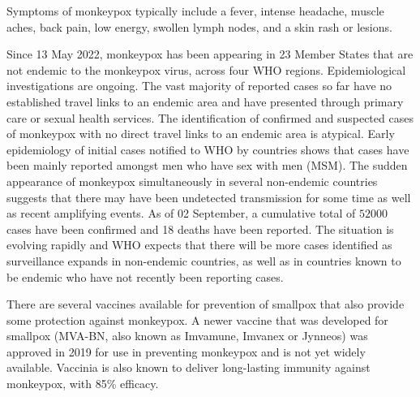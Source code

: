 Symptoms of monkeypox typically include a fever, intense headache, muscle aches, back pain, low energy, swollen lymph nodes, and a skin rash or lesions.

Since 13 May 2022, monkeypox has been appearing in 23 Member States that are not endemic to the monkeypox virus, across four WHO regions. Epidemiological investigations are ongoing. The vast majority of reported cases so far have no established travel links to an endemic area and have presented through primary care or sexual health services. The identification of confirmed and suspected cases of monkeypox with no direct travel links to an endemic area is atypical. Early epidemiology of initial cases notified to WHO by countries shows that cases have been mainly reported amongst men who have sex with men (MSM). The sudden appearance of monkeypox simultaneously in several non-endemic countries suggests that there may have been undetected transmission for some time as well as recent amplifying events.
As of 02 September, a cumulative total of $52000$ cases have been confirmed and 18 deaths have been reported.
The situation is evolving rapidly and WHO expects that there will be more cases identified as surveillance expands in non-endemic countries, as well as in countries known to be endemic who have not recently been reporting cases.

There are several vaccines available for prevention of smallpox that also provide some protection against monkeypox. A newer vaccine that was developed for smallpox (MVA-BN, also known as Imvamune, Imvanex or Jynneos) was approved in 2019 for use in preventing monkeypox and is not yet widely available. Vaccinia is also known to deliver long-lasting immunity against
monkeypox, with 85\% efficacy.
